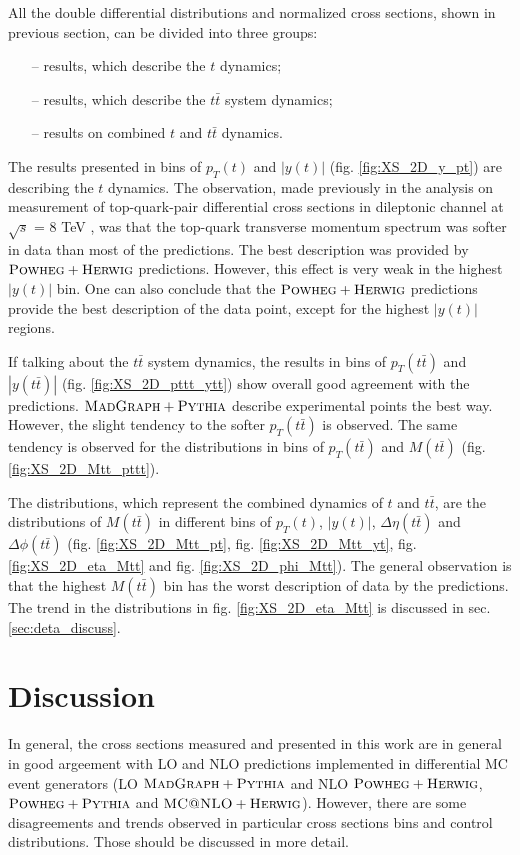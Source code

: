 All the double differential distributions and normalized cross sections, shown in previous section, can be divided into three groups:

\begin{itemize}
 \item [--] results, which describe the $t$ dynamics;
 \item [--] results, which describe the $t\bar{t}$ system dynamics;
 \item [--] results on combined $t$  and $t\bar{t}$ dynamics.
\end{itemize}

The results presented in bins of $p_{T}(t)$ and $|y(t)|$ (fig. \ref{fig:XS_2D_y_pt}) are describing the $t$
dynamics. The observation, made previously in the analysis on measurement of top-quark-pair differential cross sections in dileptonic channel at 
$\sqrt{s}$ = 8 TeV \cite{Asin2014Auth}, was that the top-quark transverse momentum spectrum was softer in data than most of the predictions. The best
description was provided by $\textsc{Powheg}+\textsc{Herwig}$ predictions. However, this effect is very weak in the highest $|y(t)|$ bin. One can also conclude that the $\textsc{Powheg}+\textsc{Herwig}$
predictions provide the best description of the data point, except for the highest $|y(t)|$ regions.

If talking about the $t\bar{t}$ system dynamics, the results in bins of $p_{T}(t\bar{t})$ and $|y(t\bar{t})|$ (fig. \ref{fig:XS_2D_pttt_ytt})
show overall good agreement with the predictions. $\textsc{MadGraph}+\textsc{Pythia}$ describe experimental points the best way. However, the slight tendency to the softer $p_{T}(t\bar{t})$
is observed. The same tendency is observed for the distributions in bins of $p_{T}(t\bar{t})$ and $M(t\bar{t})$ (fig. \ref{fig:XS_2D_Mtt_pttt}).

The distributions, which represent the combined dynamics of $t$ and $t\bar{t}$, are the distributions of $M(t\bar{t})$ in different bins of $p_{T}(t)$, $|y(t)|$,
$\Delta\eta(t\bar{t})$ and $\Delta\phi(t\bar{t})$ (fig. \ref{fig:XS_2D_Mtt_pt}, fig. \ref{fig:XS_2D_Mtt_yt}, fig. \ref{fig:XS_2D_eta_Mtt}
and fig. \ref{fig:XS_2D_phi_Mtt}). The general observation is that the highest $M(t\bar{t})$ bin has the worst description of data by the predictions. The 
trend in the distributions in fig. \ref{fig:XS_2D_eta_Mtt} is discussed in sec. \ref{sec:deta_discuss}.

\section{Discussion}
In general, the cross sections measured and presented in this work are in general in good argeement with LO and NLO predictions
implemented in differential MC event generators (LO $\textsc{MadGraph}+\textsc{Pythia}$ and NLO $\textsc{Powheg}+\textsc{Herwig}$, $\textsc{Powheg}+\textsc{Pythia}$ and $\textsc{MC@NLO}+\textsc{Herwig}$).
However, there are some disagreements and trends observed in particular cross sections bins and control distributions.
Those should be discussed in more detail.

